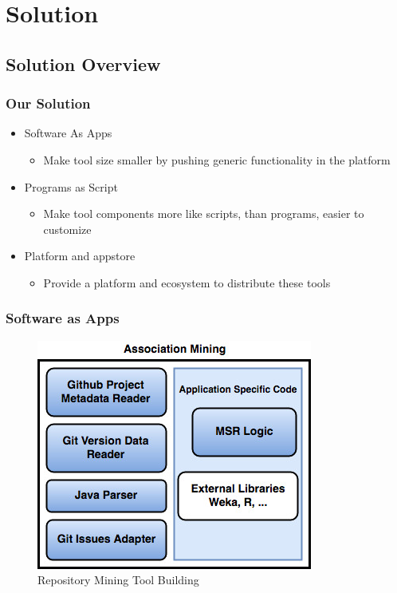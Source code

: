 \section{Solution}
    \subsection{Solution Overview}
        \begin{frame}
        \frametitle{Our Solution}
        \begin{itemize}
          \item Software As Apps
            \begin{itemize}
                \item Make tool size smaller by pushing generic functionality in the platform
            \end{itemize}
          \item Programs as Script
            \begin{itemize}
                \item Make tool components more like scripts, than programs, easier to customize
            \end{itemize}
          \item Platform and appstore
            \begin{itemize}
                \item Provide a platform and ecosystem to distribute these tools
            \end{itemize}

        \end{itemize}
        \end{frame}

        \begin{frame}
            \frametitle{Software as Apps}
            \begin{figure}
                \centering
                \includegraphics[scale=0.30]{figures/association.jpg}
                \caption{Repository Mining Tool Building}
            \end{figure}
        \end{frame}

